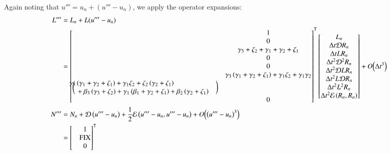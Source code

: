 \documentclass[letterpaper,11pt]{amsart}
\newcommand{\trans}[1]{{#1}^{\ensuremath{\mathsf{T}}}}
\newcommand{\order}[2]{\ensuremath{O\!\left( {#1}^{#2} \right)}}
\begin{document}
Again noting that $u''' = u_{n} + \left( u''' - u_{n} \right)$, we apply the
operator expansions:
\begin{subequations}
\begin{align}
  L'''
  &=
  L_{n}
  +
  L(u'''-u_{n})
\\
&=
\trans{\begin{bmatrix}
  &1 \\
  &0 \\
  &\gamma_{3} + \zeta_{2}
  + \gamma_{1} + \gamma_{2} + \zeta_{1} \\
  &0 \\
  &0 \\
  &\gamma_{3} \left( \gamma_{1} + \gamma_{2} + \zeta_{1} \right)
  + \gamma_{1} \zeta_{2} + \gamma_{1} \gamma_{2} \\
\bigg(\mspace{-18mu}
\begin{split}
  &\gamma_{3} \left( \gamma_{1} + \gamma_{2} + \zeta_{1} \right)
  + \gamma_{1} \zeta_{2}
  + \zeta_{2} \left( \gamma_{2} + \zeta_{1} \right)
  \\
  &\quad+ \beta_{3} \left( \gamma_{3} + \zeta_{2} \right)
  + \gamma_{1} \left( \beta_{1} + \gamma_{2} + \zeta_{1} \right)
  + \beta_{2} \left( \gamma_{2} + \zeta_{1} \right)
\end{split}
\mspace{18mu}\bigg)
  \\
  &0
\end{bmatrix}}
\begin{bmatrix}
  L_{n} \\
  \Delta{}t \mathcal{D} R_{n} \\
  \Delta{}t L R_{n} \\
  \Delta{}t^{2} \mathcal{D}^{2} R_{n} \\
  \Delta{}t^{2} \mathcal{D} L R_{n} \\
  \Delta{}t^{2} L \mathcal{D} R_{n} \\
  \Delta{}t^{2} L^{2} R_{n} \\
  \Delta{}t^{2} \mathcal{E}\left( R_{n}, R_{n} \right)
\end{bmatrix}
  + \order{\Delta{}t}{3}
\\
  N'''
  &=
  N_{n}
  + \mathcal{D} \left( u''' - u_{n} \right)
  + \frac{1}{2} \mathcal{E} \left( u'''-u_{n}, u'''-u_{n} \right)
  + \order{\left(u'''-u_{n}\right)}{3}
\\
  &=
\trans{\begin{bmatrix} %
  &1 \\
  &\mbox{FIX} \\
  &0 \\

\end{bmatrix}}
\end{align}
\end{subequations}
\end{document}
